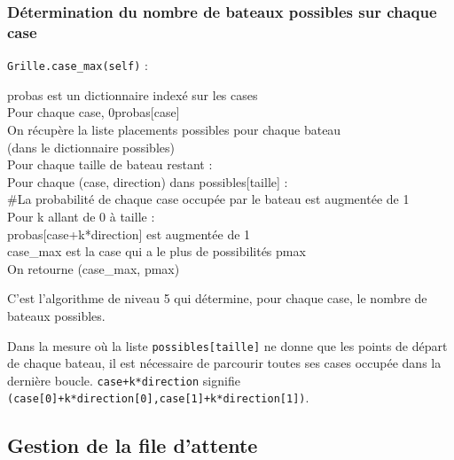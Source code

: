 \subsubsection{Détermination du nombre de bateaux possibles sur chaque case}\label{case_max}
\texttt{Grille.case\_max(self)} :
\begin{algo1}
probas est un dictionnaire indexé sur les cases\\
Pour chaque case, 0\sto probas[case]\\
On récupère la liste placements possibles pour chaque bateau\\
 (dans le dictionnaire possibles)\\
Pour chaque taille de bateau restant :\\
Pour chaque (case, direction) dans possibles[taille] :\\
\#La probabilité de chaque case occupée par le bateau est augmentée de 1\\
Pour k allant de 0 à taille :\\
probas[case+k*direction] est augmentée de 1\\
case\_max est la case qui a le plus de possibilités pmax\\
On retourne (case\_max, pmax)\\
\end{algo1}

C'est l'algorithme de niveau 5 qui détermine, pour chaque case, le nombre de bateaux possibles.

Dans la mesure où la liste \texttt{possibles[taille]} ne donne que les points de départ de chaque bateau, il est nécessaire de parcourir toutes ses cases occupée dans la dernière boucle. \texttt{case+k*direction} signifie \texttt{(case[0]+k*direction[0],case[1]+k*direction[1])}.

\newpage

\subsection{Gestion de la file d'attente}
